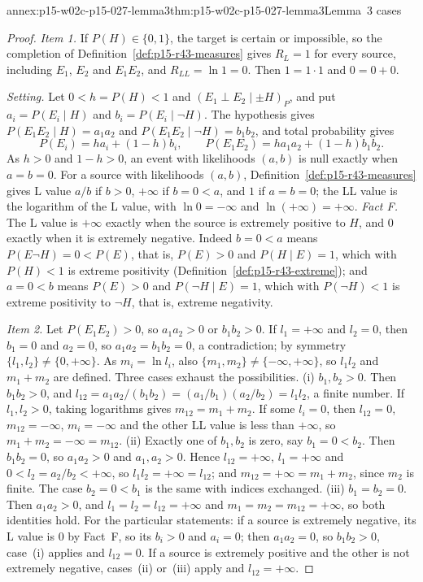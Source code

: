 \begin{annexitem}{annex:p15-w02c-p15-027-lemma3}{thm:p15-w02c-p15-027-lemma3}{Lemma~3 cases}
\begin{proof}
\emph{Item 1.} If \(P(H)\in\{0,1\}\), the target is certain or
impossible, so the completion of Definition~\ref{def:p15-r43-measures}
gives \(R_L=1\) for every source, including \(E_1\), \(E_2\) and
\(E_1E_2\), and \(R_{LL}=\ln1=0\). Then \(1=1\cdot1\) and \(0=0+0\).

\emph{Setting.} Let \(0<h=P(H)<1\) and \((E_1\perp E_2\mid\pm H)_P\), and
put \(a_i=P(E_i\mid H)\) and \(b_i=P(E_i\mid\neg H)\). The hypothesis
gives \(P(E_1E_2\mid H)=a_1a_2\) and \(P(E_1E_2\mid\neg H)=b_1b_2\), and
total probability gives
\[
 P(E_i)=ha_i+(1-h)b_i,\qquad P(E_1E_2)=ha_1a_2+(1-h)b_1b_2 .
\]
As \(h>0\) and \(1-h>0\), an event with likelihoods \((a,b)\) is null
exactly when \(a=b=0\). For a source with likelihoods \((a,b)\),
Definition~\ref{def:p15-r43-measures} gives L value \(a/b\) if \(b>0\),
\(+\infty\) if \(b=0<a\), and \(1\) if \(a=b=0\); the LL value is the
logarithm of the L value, with \(\ln0=-\infty\) and
\(\ln(+\infty)=+\infty\).
\emph{Fact F.} The L value is \(+\infty\) exactly when the source is
extremely positive to \(H\), and \(0\) exactly when it is extremely
negative. Indeed \(b=0<a\) means \(P(E\neg H)=0<P(E)\), that is,
\(P(E)>0\) and \(P(H\mid E)=1\), which with \(P(H)<1\) is extreme
positivity (Definition~\ref{def:p15-r43-extreme}); and \(a=0<b\) means
\(P(E)>0\) and \(P(\neg H\mid E)=1\), which with \(P(\neg H)<1\) is
extreme positivity to \(\neg H\), that is, extreme negativity.

\emph{Item 2.} Let \(P(E_1E_2)>0\), so \(a_1a_2>0\) or \(b_1b_2>0\). If
\(l_1=+\infty\) and \(l_2=0\), then \(b_1=0\) and \(a_2=0\), so
\(a_1a_2=b_1b_2=0\), a contradiction; by symmetry
\(\{l_1,l_2\}\neq\{0,+\infty\}\). As \(m_i=\ln l_i\), also
\(\{m_1,m_2\}\neq\{-\infty,+\infty\}\), so \(l_1l_2\) and \(m_1+m_2\) are
defined. Three cases exhaust the possibilities.
(i) \(b_1,b_2>0\). Then \(b_1b_2>0\), and
\(l_{12}=a_1a_2/(b_1b_2)=(a_1/b_1)(a_2/b_2)=l_1l_2\), a finite number. If
\(l_1,l_2>0\), taking logarithms gives \(m_{12}=m_1+m_2\). If some
\(l_i=0\), then \(l_{12}=0\), \(m_{12}=-\infty\), \(m_i=-\infty\) and the
other LL value is less than \(+\infty\), so \(m_1+m_2=-\infty=m_{12}\).
(ii) Exactly one of \(b_1,b_2\) is zero, say \(b_1=0<b_2\). Then
\(b_1b_2=0\), so \(a_1a_2>0\) and \(a_1,a_2>0\). Hence
\(l_{12}=+\infty\), \(l_1=+\infty\) and \(0<l_2=a_2/b_2<+\infty\), so
\(l_1l_2=+\infty=l_{12}\); and \(m_{12}=+\infty=m_1+m_2\), since \(m_2\)
is finite. The case \(b_2=0<b_1\) is the same with indices exchanged.
(iii) \(b_1=b_2=0\). Then \(a_1a_2>0\), and
\(l_1=l_2=l_{12}=+\infty\) and \(m_1=m_2=m_{12}=+\infty\), so both
identities hold.
For the particular statements: if a source is extremely negative, its
L value is \(0\) by Fact~F, so its \(b_i>0\) and \(a_i=0\); then
\(a_1a_2=0\), so \(b_1b_2>0\), case~(i) applies and \(l_{12}=0\). If a
source is extremely positive and the other is not extremely negative,
cases~(ii) or~(iii) apply and \(l_{12}=+\infty\).


\end{proof}
\end{annexitem}
